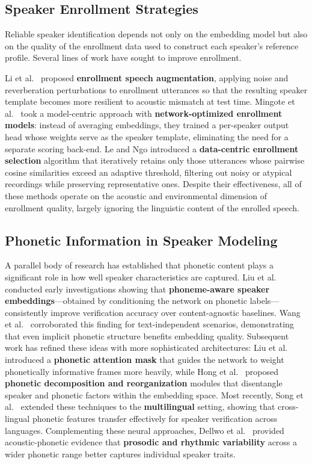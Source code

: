 \subsection{Speaker Enrollment Strategies}

Reliable speaker identification depends not only on the embedding model but also on the quality of the enrollment data used to construct each speaker's reference profile. Several lines of work have sought to improve enrollment.

Li et al.\ \cite{li2024enrollment} proposed \textbf{enrollment speech augmentation}, applying noise and reverberation perturbations to enrollment utterances so that the resulting speaker template becomes more resilient to acoustic mismatch at test time. Mingote et al.\ \cite{mingote2020enrollment} took a model-centric approach with \textbf{network-optimized enrollment models}: instead of averaging embeddings, they trained a per-speaker output head whose weights serve as the speaker template, eliminating the need for a separate scoring back-end. Le and Ngo \cite{le2025datacentric} introduced a \textbf{data-centric enrollment selection} algorithm that iteratively retains only those utterances whose pairwise cosine similarities exceed an adaptive threshold, filtering out noisy or atypical recordings while preserving representative ones. Despite their effectiveness, all of these methods operate on the acoustic and environmental dimension of enrollment quality, largely ignoring the linguistic content of the enrolled speech.

\subsection{Phonetic Information in Speaker Modeling}

A parallel body of research has established that phonetic content plays a significant role in how well speaker characteristics are captured. Liu et al.\ \cite{liu2018phonetic,liu2019phonetic} conducted early investigations showing that \textbf{phoneme-aware speaker embeddings}---obtained by conditioning the network on phonetic labels---consistently improve verification accuracy over content-agnostic baselines. Wang et al.\ \cite{wang2019phonetic} corroborated this finding for text-independent scenarios, demonstrating that even implicit phonetic structure benefits embedding quality. Subsequent work has refined these ideas with more sophisticated architectures: Liu et al.\ \cite{liu2022phonetic} introduced a \textbf{phonetic attention mask} that guides the network to weight phonetically informative frames more heavily, while Hong et al.\ \cite{hong2023phonetic} proposed \textbf{phonetic decomposition and reorganization} modules that disentangle speaker and phonetic factors within the embedding space. Most recently, Song et al.\ \cite{song2024phonetic} extended these techniques to the \textbf{multilingual} setting, showing that cross-lingual phonetic features transfer effectively for speaker verification across languages. Complementing these neural approaches, Dellwo et al.\ \cite{dellwo2015rhythm} provided acoustic-phonetic evidence that \textbf{prosodic and rhythmic variability} across a wider phonetic range better captures individual speaker traits.

